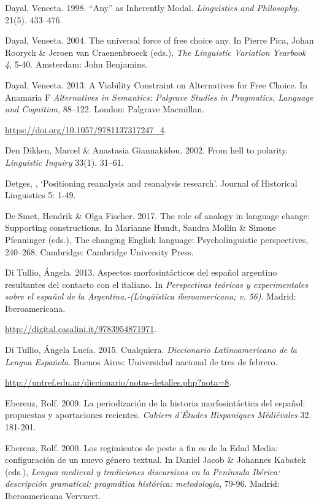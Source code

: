 \documentclass[output=paper]{langscibook}
\begin{document}
Dayal, Veneeta. 1998. “Any” as Inherently Modal. \textit{Linguistics and Philosophy}. 21(5). 433–476.

Dayal, Veneeta. 2004. The universal force of free choice any. In Pierre Pica, Johan Rooryck \& Jeroen van Craenenbroeck (eds.), \textit{The Linguistic Variation Yearbook 4}, 5-40. Amsterdam: John Benjamins.

Dayal, Veneeta. 2013. A Viability Constraint on Alternatives for Free Choice. In Anamaria F \textit{Alternatives in Semantics: Palgrave Studies in Pragmatics, Language and Cognition}, 88–122. London: Palgrave Macmillan. 

  \url{https://doi.org/10.1057/9781137317247_4}.

Den Dikken, Marcel \& Anastasia Giannakidou. 2002. From hell to polarity. \textit{Linguistic Inquiry} 33(1). 31–61.

Detges, \citealt{UlrichEtAl2021}, ‘Positioning reanalysis and reanalysis research’. Journal of Historical Linguistics 5: 1-49.

De Smet, Hendrik \& Olga Fischer. 2017. The role of analogy in language change: Supporting constructions. In Marianne Hundt, Sandra Mollin \& Simone Pfenninger (eds.), The changing English language: Psycholinguistic perspectives, 240–268. Cambridge: Cambridge University Press.

Di Tullio, Ángela. 2013. Aspectos morfosintácticos del español argentino resultantes del contacto con el italiano. In \textit{Perspectivas teóricas y experimentales sobre el español de la Argentina.-(Lingüística iberoamericana; v. 56)}. Madrid: Iberoamericana. 

  \url{http://digital.casalini.it/9783954871971}.

Di Tullio, Ángela Lucía. 2015. Cualquiera. \textit{Diccionario Latinoamericano de la Lengua Española}. Buenos Aires: Universidad nacional de tres de febrero. 

  \url{http://untref.edu.ar/diccionario/notas-detalles.php?nota=8}.

Eberenz, Rolf. 2009. La periodización de la historia morfosintáctica del español: propuestas y aportaciones recientes. \textit{Cahiers d'Études Hispaniques Médiévales} 32. 181-201. 

Eberenz, Rolf. 2000. Los regimientos de peste a fin es de la Edad Media: configuración de un nuevo género textual. In Daniel Jacob \& Johannes Kabatek (eds.), \textit{Lengua medieval y tradiciones discursivas en la Península Ibérica: descripción gramatical: pragmática histórica: metodología}, 79-96. Madrid: Iberoamericana Vervuert. 
\end{document}
